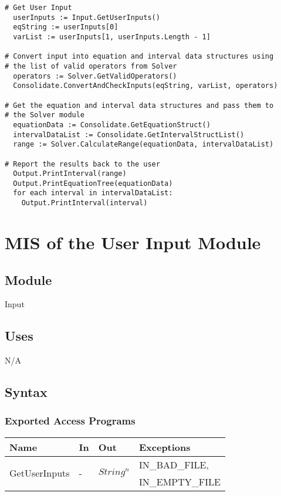 \documentclass[12pt, titlepage]{article}
\begin{document}
\begin{lstlisting}
# Get User Input
  userInputs := Input.GetUserInputs()
  eqString := userInputs[0]
  varList := userInputs[1, userInputs.Length - 1]    
 
# Convert input into equation and interval data structures using 
# the list of valid operators from Solver
  operators := Solver.GetValidOperators()
  Consolidate.ConvertAndCheckInputs(eqString, varList, operators)
  
# Get the equation and interval data structures and pass them to 
# the Solver module
  equationData := Consolidate.GetEquationStruct()
  intervalDataList := Consolidate.GetIntervalStructList()
  range := Solver.CalculateRange(equationData, intervalDataList)
  
# Report the results back to the user
  Output.PrintInterval(range)
  Output.PrintEquationTree(equationData)
  for each interval in intervalDataList:
    Output.PrintInterval(interval)
\end{lstlisting}

\newpage

\section{MIS of the User Input Module} 
\label{Module_userinput}

\subsection{Module}

Input

\subsection{Uses}

N/A

\subsection{Syntax}

\subsubsection{Exported Access Programs}

\begin{center}
	\begin{tabular}{p{3cm} p{3cm} p{3cm} p{5cm}}
		\hline
		\textbf{Name} & \textbf{In} & \textbf{Out} & \textbf{Exceptions} \\
		\hline
		\multirow{2}{3cm}{GetUserInputs} & \multirow{2}{3cm}{-} & 
		\multirow{2}{3cm}{$String^n$} & IN\_BAD\_FILE, \\
		 &  &  & IN\_EMPTY\_FILE \\
		\hline
	\end{tabular}
\end{center}
\end{document}
